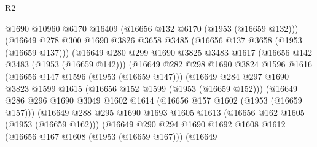 \begin{lexlean}{R2}
\begin{coremodule}
                        @1690
                        @10960
                        @6170
                        @16409
                        (@16656 @132 @6170 (@1953 (@16659 @132)))
                        (@16649
                          @278
                          @300
                          @1690
                          @3826
                          @3658
                          @3485
                          (@16656 @137 @3658 (@1953 (@16659 @137)))
                          (@16649
                            @280
                            @299
                            @1690
                            @3825
                            @3483
                            @1617
                            (@16656 @142 @3483 (@1953 (@16659 @142)))
                            (@16649
                              @282
                              @298
                              @1690
                              @3824
                              @1596
                              @1616
                              (@16656 @147 @1596 (@1953 (@16659 @147)))
                              (@16649
                                @284
                                @297
                                @1690
                                @3823
                                @1599
                                @1615
                                (@16656 @152 @1599 (@1953 (@16659 @152)))
                                (@16649
                                  @286
                                  @296
                                  @1690
                                  @3049
                                  @1602
                                  @1614
                                  (@16656 @157 @1602 (@1953 (@16659 @157)))
                                  (@16649
                                    @288
                                    @295
                                    @1690
                                    @1693
                                    @1605
                                    @1613
                                    (@16656 @162 @1605 (@1953 (@16659 @162)))
                                    (@16649
                                      @290
                                      @294
                                      @1690
                                      @1692
                                      @1608
                                      @1612
                                      (@16656 @167 @1608 (@1953 (@16659 @167)))
                                      (@16649

\end{coremodule}
\end{lexlean}
